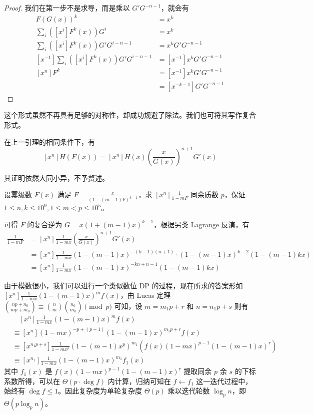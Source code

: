 \begin{proof} 我们在第一步不是求导，而是乘以 $G'G^{-n-1}$，就会有
\begin{align*}
F(G(x))^k &= x^k\\
\sum_i ([x^i]F^k(x))G^i &= x^k\\
\sum_i ([x^i]F^k(x))G'G^{i-n-1} &= x^k G'G^{-n-1}\\
[x^{-1}]\sum_i ([x^i]F^k(x))G'G^{i-n-1} &= [x^{-1}]x^k G'G^{-n-1}\\
[x^n]F^k &= [x^{-1}]x^k G'G^{-n-1}\\
&= [x^{-k-1}]G'G^{-n-1}
\end{align*}
\end{proof}

这个形式虽然不再具有足够的对称性，却成功规避了除法。我们也可将其写作复合形式。

\begin{lemma} 在上一引理的相同条件下，有
$$
[x^n] H(F(x)) = [x^n]H(x)\left(\frac{x}{G(x)}\right)^{n+1}G'(x)
$$
\end{lemma}

其证明依然大同小异，不予赘述。

\begin{problem}
设幂级数 $F(x)$ 满足 $F = \frac x{(1-(m-1)F)^{k-1}}$，求 $[x^n]\frac 1{1-mF}$ 同余质数 $p$，保证 $1\le n,k\le 10^9, 1\le m < p\le 10^5$。
\end{problem}

\begin{solution}
可得 $F$ 的复合逆为 $G=x(1+(m-1)x)^{k-1}$，根据另类 Lagrange 反演，有
\begin{align*}
[x^n] \frac 1{1-mF}
&= [x^n]\frac 1{1-mx}\left(\frac{x}{G(x)}\right)^{n+1}G'(x)\\
&= [x^n]\frac 1{1-mx}(1-(m-1)x)^{-(k-1)(n+1)} \cdot (1-(m-1)x)^{k-2}(1-(m-1)kx)\\
&= [x^n]\frac 1{1-mx}(1-(m-1)x)^{-kn+n-1}(1-(m-1)kx)
\end{align*}

由于模数很小，我们可以进行一个类似数位 DP 的过程，现在所求的答案形如 $[x^n] \frac 1{1-mx}(1-(m-1)x)^mf(x)$，由 Lucas 定理 $\binom {np+n_0}{mp+m_0} \equiv \binom n m\binom{n_0}{m_0} \pmod p$ 可知，设 $m=m_1p+r$ 和 $n=n_1p+s$ 则有
\begin{align*}
&\quad [x^n] \frac 1{1-mx}(1-(m-1)x)^mf(x)\\
&\equiv [x^n] (1-mx)^{-p+(p-1)}(1-(m-1)x)^{m_1p+r} f(x)\\
&\equiv [x^{n_1p+s}] \frac 1{1-mx^p}(1-(m-1)x^p)^{m_1} (f(x)(1-mx)^{p-1}(1-(m-1)x)^r)\\
&\equiv [x^{n_1}] \frac 1{1-mx}(1-(m-1)x)^{m_1} f_1(x)
\end{align*}
其中 $f_1(x)$ 是 $f(x)(1-mx)^{p-1}(1-(m-1)x)^r$ 提取同余 $p$ 余 $s$ 的下标系数所得，可以在 $\Theta(p\cdot \deg f)$ 内计算，归纳可知在 $f\leftarrow f_1$ 这一迭代过程中，始终有 $\deg f \le 1$。因此复杂度为单轮复杂度 $\Theta(p)$ 乘以迭代轮数 $\log_p n$，即 $\Theta(p\log_p n)$。
\end{solution}

